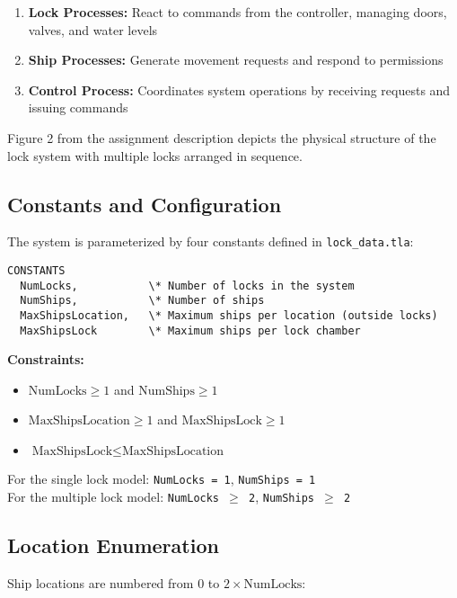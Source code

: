 \documentclass[12pt,a4paper]{article}
\begin{document}
\begin{enumerate}
    \item \textbf{Lock Processes:} React to commands from the controller, managing doors, valves, and water levels
    \item \textbf{Ship Processes:} Generate movement requests and respond to permissions
    \item \textbf{Control Process:} Coordinates system operations by receiving requests and issuing commands
\end{enumerate}

Figure 2 from the assignment description depicts the physical structure of the lock system with multiple locks arranged in sequence.

\subsection{Constants and Configuration}

The system is parameterized by four constants defined in \texttt{lock\_data.tla}:

\begin{lstlisting}[style=tlaplus, caption={System Constants}]
CONSTANTS
  NumLocks,           \* Number of locks in the system
  NumShips,           \* Number of ships
  MaxShipsLocation,   \* Maximum ships per location (outside locks)
  MaxShipsLock        \* Maximum ships per lock chamber
\end{lstlisting}

\textbf{Constraints:}
\begin{itemize}
    \item $\text{NumLocks} \geq 1$ and $\text{NumShips} \geq 1$
    \item $\text{MaxShipsLocation} \geq 1$ and $\text{MaxShipsLock} \geq 1$
    \item $\text{MaxShipsLock} \leq \text{MaxShipsLocation}$
\end{itemize}

For the single lock model: \texttt{NumLocks = 1}, \texttt{NumShips = 1}\\
For the multiple lock model: \texttt{NumLocks $\geq$ 2}, \texttt{NumShips $\geq$ 2}

\subsection{Location Enumeration}

Ship locations are numbered from 0 to $2 \times \text{NumLocks}$:
\end{document}
